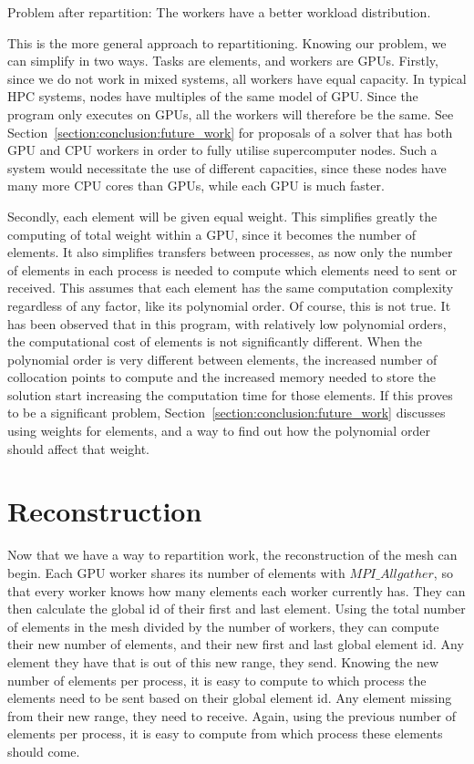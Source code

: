 \begin{table}[H]
\begin{center}
		\caption{Problem after repartition: The workers have a better workload distribution.}
		\label{table:after_repartition}
	\end{center}
\end{table}

This is the more general approach to repartitioning. Knowing our problem, we can simplify in two
ways. Tasks are elements, and workers are GPUs. Firstly, since we do not work in mixed systems, all
workers have equal capacity. In typical HPC systems, nodes have multiples of the same model of GPU.
Since the program only executes on GPUs, all the workers will therefore be the same. See
Section~\ref{section:conclusion:future_work} for proposals of a solver that has both GPU and CPU
workers in order to fully utilise supercomputer nodes. Such a system would necessitate the use of
different capacities, since these nodes have many more CPU cores than GPUs, while each GPU is much
faster. 

Secondly, each element will be given equal weight. This simplifies greatly the computing of total
weight within a GPU, since it becomes the number of elements. It also simplifies transfers between
processes, as now only the number of elements in each process is needed to compute which elements
need to sent or received. This assumes that each element has the same computation complexity
regardless of any factor, like its polynomial order. Of course, this is not true. It has been
observed that in this program, with relatively low polynomial orders, the computational cost of
elements is not significantly different. When the polynomial order is very different between
elements, the increased number of collocation points to compute and the increased memory needed to
store the solution start increasing the computation time for those elements. If this proves to be a
significant problem, Section~\ref{section:conclusion:future_work} discusses using weights for
elements, and a way to find out how the polynomial order should affect that weight.

\section{Reconstruction} \label{section:load_balancing:reconstruction}

Now that we have a way to repartition work, the reconstruction of the mesh can begin. Each GPU
worker shares its number of elements with $MPI\_Allgather$, so that every worker knows how many
elements each worker currently has. They can then calculate the global id of their first and last
element. Using the total number of elements in the mesh divided by the number of workers, they can
compute their new number of elements, and their new first and last global element id. Any element
they have that is out of this new range, they send. Knowing the new number of elements per process,
it is easy to compute to which process the elements need to be sent based on their global element
id. Any element missing from their new range, they need to receive. Again, using the previous number
of elements per process, it is easy to compute from which process these elements should come. 

